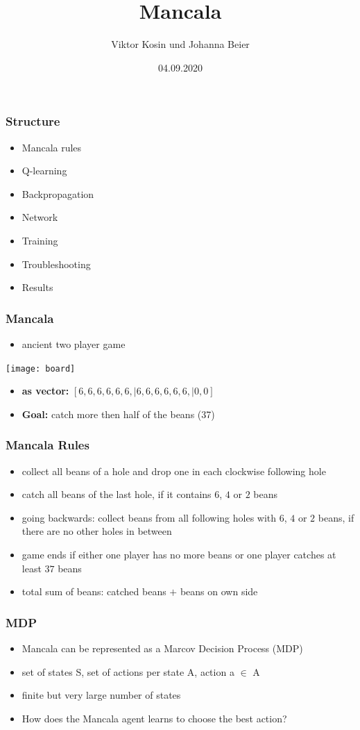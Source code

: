 \documentclass{beamer}
\title{Mancala}
\author{Viktor Kosin und Johanna Beier}
\date{04.09.2020}
\begin{document}
\frame{\titlepage}

\begin{frame}
\frametitle{Structure}
\begin{itemize}
\item Mancala rules
\item Q-learning
\item Backpropagation
\item Network
\item Training
\item Troubleshooting
\item Results
\end{itemize}
\end{frame}

\begin{frame}
\frametitle{Mancala}
\begin{itemize}
\item ancient two player game
\end{itemize}
\texttt{[image: board]}
\begin{itemize}
\item \textbf{as vector:} $[6,6,6,6,6,6, | 6,6,6,6,6,6, |0,0]$
\item\textbf{Goal:} catch more then half of the beans (37) 
\end{itemize}
\end{frame}

\begin{frame}
\frametitle{Mancala Rules}
\begin{itemize}
\item collect all beans of a hole and drop one in each clockwise following hole
\item catch all beans of the last hole, if it contains $6$, $4$ or $2$ beans
\item going backwards: collect beans from all following holes with $6$, $4$ or $2$ beans, if there are no other holes in between
\item game ends if either one player has no more beans or one player catches at least $37$ beans
\item total sum of beans: catched beans $+$ beans on own side
\end{itemize}
\end{frame}

\begin{frame}
 \frametitle{MDP}
 \begin{itemize}
 \item Mancala can be represented as a Marcov Decision Process (MDP) 
 \item set of states S, set of actions per state A, action a $\in$ A
\item finite but very large number of states
 \item How does the Mancala agent learns to choose the best action?
 \end{itemize}
 \end{frame}
\end{document}
